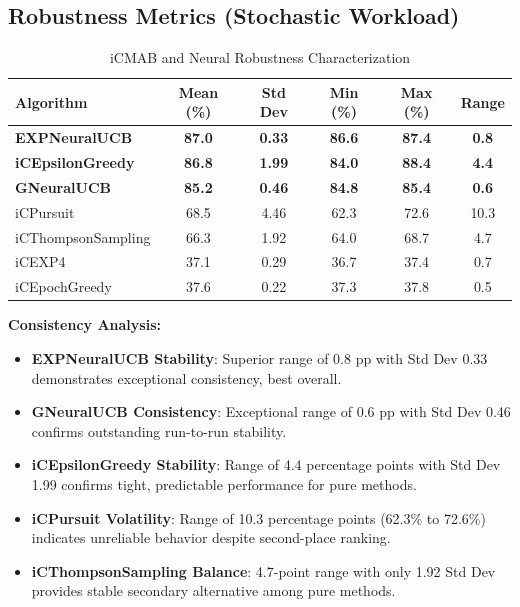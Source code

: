 \documentclass[12pt,a4paper]{article}
\newcommand{\secondarytext}[1]{\textcolor{secondaryblue}{\textbf{#1}}}
\newcommand{\success}[1]{\textcolor{accentgreen}{\textbf{#1}}}
\newcommand{\warning}[1]{\textcolor{warningred}{\textbf{#1}}}
\newcommand{\legacy}[1]{\textcolor{legacycolor}{\textbf{#1}}}
\newcommand{\neural}[1]{\textcolor{neuralcolor}{\textbf{#1}}}
\begin{document}
\subsection{Robustness Metrics (Stochastic Workload)}

\begin{table}[H]
\centering
\caption{iCMAB and Neural Robustness Characterization}
\label{tab:robustness}
\begin{tabular}{@{}lccccc@{}}
\toprule
\textbf{Algorithm} & \textbf{Mean (\%)} & \textbf{Std Dev} & \textbf{Min (\%)} & \textbf{Max (\%)} & \textbf{Range} \\
\midrule
\legacy{EXPNeuralUCB}       & \legacy{87.0} & \legacy{0.33} & \legacy{86.6} & \legacy{87.4} & \legacy{0.8} \\
\success{iCEpsilonGreedy}   & \success{86.8} & \success{1.99} & \success{84.0} & \success{88.4} & \success{4.4} \\
\neural{GNeuralUCB}        & \neural{85.2} & \neural{0.46} & \neural{84.8} & \neural{85.4} & \neural{0.6} \\
iCPursuit                   & 68.5 & 4.46 & 62.3 & 72.6 & 10.3 \\
iCThompsonSampling          & 66.3 & 1.92 & 64.0 & 68.7 & 4.7 \\
iCEXP4                      & 37.1 & 0.29 & 36.7 & 37.4 & 0.7 \\
iCEpochGreedy               & 37.6 & 0.22 & 37.3 & 37.8 & 0.5 \\
\bottomrule
\end{tabular}
\end{table}

\textbf{Consistency Analysis:}
\begin{itemize}
\item \legacy{EXPNeuralUCB Stability}: Superior range of 0.8 pp with Std Dev 0.33 demonstrates exceptional consistency, best overall.
\item \neural{GNeuralUCB Consistency}: Exceptional range of 0.6 pp with Std Dev 0.46 confirms outstanding run-to-run stability.
\item \success{iCEpsilonGreedy Stability}: Range of 4.4 percentage points with Std Dev 1.99 confirms tight, predictable performance for pure methods.
\item \warning{iCPursuit Volatility}: Range of 10.3 percentage points (62.3\% to 72.6\%) indicates unreliable behavior despite second-place ranking.
\item \secondarytext{iCThompsonSampling Balance}: 4.7-point range with only 1.92 Std Dev provides stable secondary alternative among pure methods.
\end{itemize}
\end{document}
